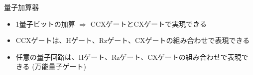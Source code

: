 \begin{frame}[t,fragile]{量子加算器}
  \begin{itemize}
  \item 1量子ビットの加算 $\Rightarrow$ CCXゲートとCXゲートで実現できる
    \begin{center}
    \end{center}
  \item CCXゲートは、Hゲート、Rzゲート、CXゲートの組み合わせで表現できる
  \item 任意の量子回路は、Hゲート、Rzゲート、CXゲートの組み合わせで表現できる (万能量子ゲート)
  \end{itemize}
\end{frame}

